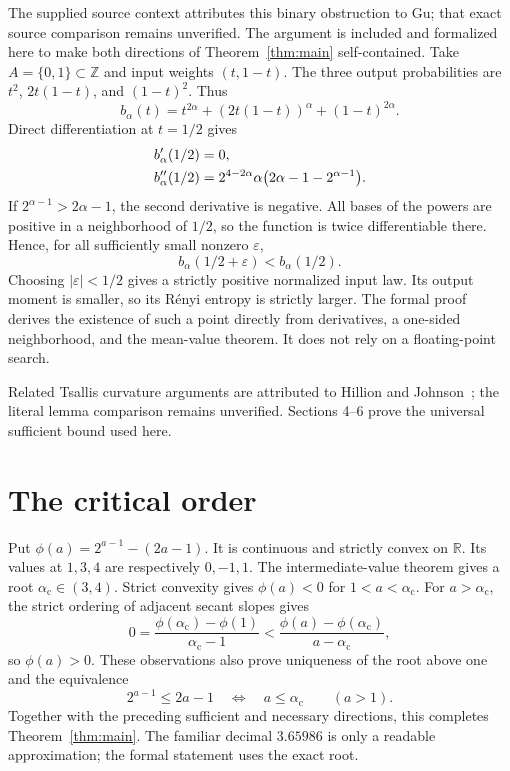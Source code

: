 \documentclass[11pt,a4paper]{article}
\newcommand{\R}{\mathbb R}
\newcommand{\crit}{\alpha_{\mathrm c}}
\begin{document}
The supplied source context attributes this binary obstruction to Gu; that
exact source comparison remains unverified. The argument is included and
formalized here to make both directions of Theorem~\ref{thm:main}
self-contained. Take $A=\{0,1\}\subset\mathbb Z$ and input weights
$(t,1-t)$. The three output probabilities are $t^2$, $2t(1-t)$, and
$(1-t)^2$. Thus
\[
b_\alpha(t)=t^{2\alpha}+(2t(1-t))^\alpha+(1-t)^{2\alpha}.
\]
Direct differentiation at $t=1/2$ gives
\begin{align}
b_\alpha'(1/2)&=0,\notag\\
b_\alpha''(1/2)
&=2^{4-2\alpha}\alpha\bigl(2\alpha-1-2^{\alpha-1}\bigr).
\label{eq:curvature}
\end{align}
If $2^{\alpha-1}>2\alpha-1$, the second derivative is negative. All bases
of the powers are positive in a neighborhood of $1/2$, so the function is
twice differentiable there. Hence, for all sufficiently small nonzero
$\varepsilon$,
\[
b_\alpha(1/2+\varepsilon)<b_\alpha(1/2).
\]
Choosing $|\varepsilon|<1/2$ gives a strictly positive normalized input law.
Its output moment is smaller, so its R\'enyi entropy is strictly larger.
The formal proof derives the existence of such a point directly from
derivatives, a one-sided neighborhood, and the mean-value theorem.
It does not rely on a floating-point search.

Related Tsallis curvature arguments are attributed to Hillion and
Johnson~\cite{HJ}; the literal lemma comparison remains unverified.
Sections 4--6 prove the universal sufficient bound used here.

\section{The critical order}

Put $\phi(a)=2^{a-1}-(2a-1)$. It is continuous and strictly convex on
$\R$. Its values at $1,3,4$ are respectively $0,-1,1$.
The intermediate-value theorem gives a root $\crit\in(3,4)$.
Strict convexity gives $\phi(a)<0$ for $1<a<\crit$.
For $a>\crit$, the strict ordering of adjacent secant slopes gives
\[
0=\frac{\phi(\crit)-\phi(1)}{\crit-1}
<\frac{\phi(a)-\phi(\crit)}{a-\crit},
\]
so $\phi(a)>0$. These observations also prove uniqueness of the root above
one and the equivalence
\[
2^{a-1}\le2a-1\quad\Longleftrightarrow\quad a\le\crit
\qquad(a>1).
\]
Together with the preceding sufficient and necessary directions, this
completes Theorem~\ref{thm:main}. The familiar decimal $3.65986$ is only a
readable approximation; the formal statement uses the exact root.
\end{document}
